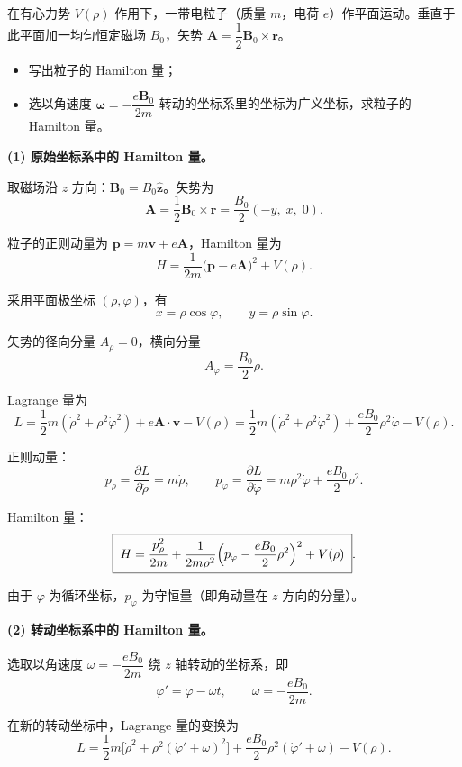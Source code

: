 \begin{question}
在有心力势 \(V(\rho)\) 作用下，一带电粒子（质量 \(m\)，电荷 \(e\)）作平面运动。垂直于此平面加一均匀恒定磁场 \(B_0\)，矢势 \(\boldsymbol A = \dfrac12 \boldsymbol B_0 \times \boldsymbol r\)。

\begin{itemize}
  \item[(1)] 写出粒子的 Hamilton 量；
  \item[(2)] 选以角速度 \(\boldsymbol\omega = -\dfrac{e\boldsymbol B_0}{2m}\) 转动的坐标系里的坐标为广义坐标，求粒子的 Hamilton 量。
\end{itemize}

\begin{solution}
\textbf{(1) 原始坐标系中的 Hamilton 量。}

取磁场沿 \(z\) 方向：\(\boldsymbol B_0 = B_0 \hat{\boldsymbol z}\)。矢势为
\[
\boldsymbol A = \frac12 \boldsymbol B_0 \times \boldsymbol r
= \frac{B_0}{2}(-y,\;x,\;0).
\]

粒子的正则动量为 \(\boldsymbol p = m\boldsymbol v + e\boldsymbol A\)，Hamilton 量为
\[
H = \frac{1}{2m}\bigl(\boldsymbol p - e\boldsymbol A\bigr)^2 + V(\rho).
\]

采用平面极坐标 \((\rho,\varphi)\)，有
\[
x = \rho\cos\varphi,\qquad y = \rho\sin\varphi .
\]

矢势的径向分量 \(A_\rho = 0\)，横向分量
\[
A_\varphi = \frac{B_0}{2}\rho .
\]

Lagrange 量为
\[
L = \frac12 m(\dot\rho^2 + \rho^2\dot\varphi^2) + e\boldsymbol A\cdot\boldsymbol v - V(\rho)
= \frac12 m(\dot\rho^2 + \rho^2\dot\varphi^2) + \frac{eB_0}{2}\rho^2\dot\varphi - V(\rho).
\]

正则动量：
\[
p_\rho = \frac{\partial L}{\partial\dot\rho} = m\dot\rho,\qquad
p_\varphi = \frac{\partial L}{\partial\dot\varphi} = m\rho^2\dot\varphi + \frac{eB_0}{2}\rho^2 .
\]

Hamilton 量：
\[
\boxed{\;H = \frac{p_\rho^2}{2m}
+ \frac{1}{2m\rho^2}\Bigl(p_\varphi - \frac{eB_0}{2}\rho^2\Bigr)^2
+ V(\rho)\;}.
\]

由于 \(\varphi\) 为循环坐标，\(p_\varphi\) 为守恒量（即角动量在 \(z\) 方向的分量）。

\textbf{(2) 转动坐标系中的 Hamilton 量。}

选取以角速度 \(\omega = -\dfrac{eB_0}{2m}\) 绕 \(z\) 轴转动的坐标系，即
\[
\varphi' = \varphi - \omega t,\qquad \omega = -\frac{eB_0}{2m}.
\]

在新的转动坐标中，Lagrange 量的变换为
\[
L = \frac12 m\bigl[\dot\rho^2 + \rho^2(\dot\varphi' + \omega)^2\bigr]
+ \frac{eB_0}{2}\rho^2(\dot\varphi' + \omega) - V(\rho).
\]


\end{solution}
\end{question}
